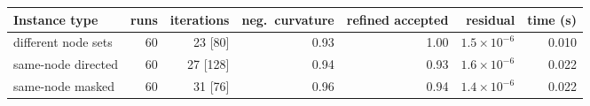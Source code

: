 \begin{tabular}{lrrrrrr}
\toprule
Instance type & runs & iterations & neg.\ curvature & refined accepted & residual & time (s)\\
\midrule
different node sets & 60 & 23 [80] & 0.93 & 1.00 & $1.5\times10^{-6}$ & 0.010\\
same-node directed & 60 & 27 [128] & 0.94 & 0.93 & $1.6\times10^{-6}$ & 0.022\\
same-node masked & 60 & 31 [76] & 0.96 & 0.94 & $1.4\times10^{-6}$ & 0.022\\
\bottomrule
\end{tabular}
